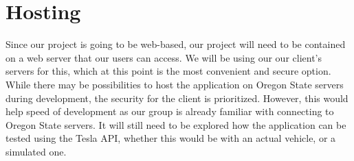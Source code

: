 \documentclass[onecolumn, draftclsnofoot,10pt, compsoc]{IEEEtran}
\begin{document}
\section{Hosting}

    Since our project is going to be web-based, our project will need to be contained on a web server that our users can access.
    We will be using our our client's servers for this, which at this point is the most convenient and secure option. While there may be possibilities to host the application on Oregon State servers during development, the security for the client is prioritized. However, this would help speed of development as our group is already familiar with connecting to Oregon State servers. It will still need to be explored how the application can be tested using the Tesla API, whether this would be with an actual vehicle, or a simulated one. 



\end{document}

